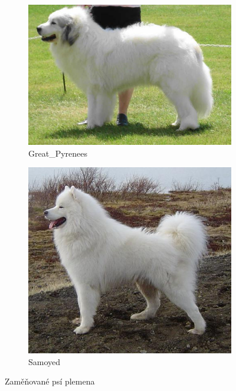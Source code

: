 \documentclass[a4paper,12pt]{article}
\begin{document}
\begin{figure}[ht!]
    \begin{subfigure}{0.35\linewidth}
        \centering
        \includegraphics[width=1\linewidth]{Figures/great_pyrenees.jpg}
        \caption{Great\_Pyrenees}
    \end{subfigure}
    \begin{subfigure}{0.35\linewidth}
        \centering
        \includegraphics[width=1\linewidth]{Figures/samoyed.jpg}
        \caption{Samoyed}
    \end{subfigure}

    \caption{Zaměňované psí plemena}
    \label{fig:lukeland_airedale}
\end{figure}







\end{document}
